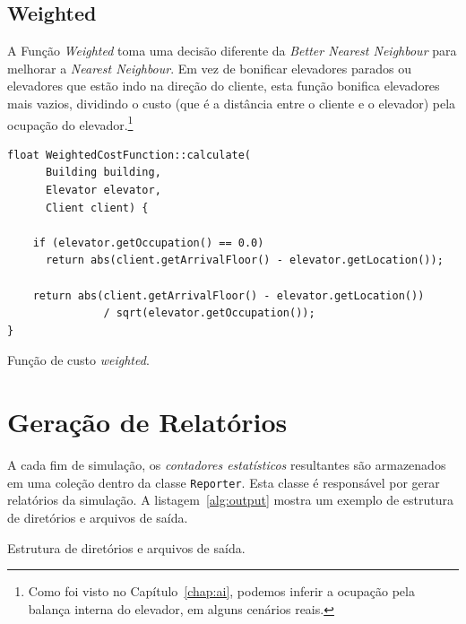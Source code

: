 \subsection{\label{model:costfunctions:weighted}Weighted}
A Função \textit{Weighted} toma uma decisão diferente da \textit{Better Nearest
  Neighbour} para melhorar a \textit{Nearest Neighbour}. Em vez de bonificar
elevadores parados ou elevadores que estão indo na direção do cliente, esta
função bonifica elevadores mais vazios, dividindo o custo (que é a distância
entre o cliente e o elevador) pela ocupação do elevador.\footnote{Como foi visto
no Capítulo~\ref{chap:ai}, podemos inferir a ocupação pela balança interna do elevador, em
alguns cenários reais.}

\begin{algorithm}[htb!]
  \centering
  \begin{verbatim}
float WeightedCostFunction::calculate(
      Building building,
      Elevator elevator,
      Client client) {

    if (elevator.getOccupation() == 0.0)
      return abs(client.getArrivalFloor() - elevator.getLocation());

    return abs(client.getArrivalFloor() - elevator.getLocation())
               / sqrt(elevator.getOccupation());
}
  \end{verbatim}
  \caption{\label{alg:weighted_cf}Função de custo \textit{weighted}.}
\end{algorithm}

\section{Geração de Relatórios} \label{model:report}

A cada fim de simulação, os \textit{contadores estatísticos} resultantes são
armazenados em uma coleção dentro da classe \texttt{Reporter}. Esta classe é
responsável por gerar relatórios da simulação. A listagem~\ref{alg:output}
mostra um exemplo de estrutura de diretórios e arquivos de saída.

\begin{listing}[H]
\caption
   {\label{alg:output}Estrutura de diretórios e arquivos de saída.}
\end{listing}

